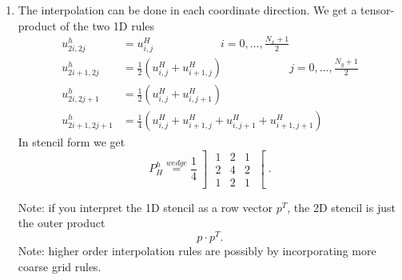 \begin{enumerate}[label=\Alph{enumi})]
\begin{enumerate}[label=\underline{\arabic{enumi}D}]
	\item The interpolation can be done in each coordinate direction.
		We get a tensor-product of the two 1D rules
		\begin{align*}
			u_{2i, 2j}^{h} &= u_{i,j}^{H} \qquad\qquad\qquad i=0, \ldots, \frac{N_{x}+1}{2} \\
			u_{2i+1, 2j}^{h} &= \frac{1}{2}(u_{i,j}^{H}+u_{i+1,j}^{H}) \qquad\qquad\qquad j=0, \ldots, \frac{N_{y}+1}{2} \\
			u_{2i,2j+1}^{h} &= \frac{1}{2}(u_{i,j}^{H}+u_{i,j+1}^{H}) \\
			u_{2i+1, 2j+1}^{h} &= \frac{1}{4}(u_{i,j}^{H}+ u_{i+1,j}^{H}+ u_{i,j+1}^{H}+ u_{i+1,j+1}^{H})
		\end{align*}
		In stencil form we get
		\[
			P_{H}^{h} \overset{wedge}{=} \frac{1}{4}
			\left]
			\begin{matrix}
				1 & 2 & 1 \\
				2 & 4 & 2 \\
				1 & 2 & 1 
			\end{matrix}
			\right[
		.\] 
		
		Note: if you interpret the 1D stencil as a row vector $p^{T}$, the 2D stencil is just the outer product 
		\[
		p\cdot p^{T}
		.\] 
		Note: higher order interpolation rules are possibly by incorporating more coarse grid rules.
		\end{enumerate}
		

\end{enumerate}

